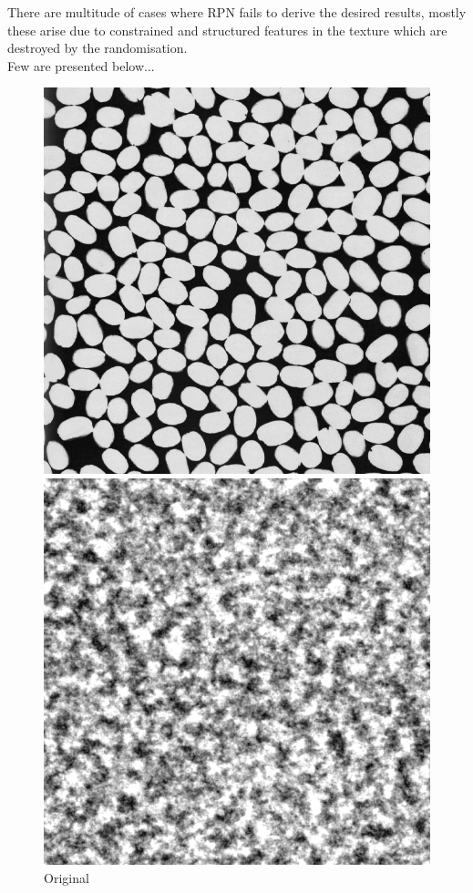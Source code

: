 \documentclass{article}
\begin{document}
\pagebreak
There are multitude of cases where RPN fails to derive the desired results, mostly these arise due to constrained and structured features in the texture which are destroyed by the randomisation.\\ Few are presented below...\\[10pt]

    \begin{figure}[!htb]
    \begin{center}
      \includegraphics[scale=.3]{5/report/random/3.png}
      \caption{Original}
    \end{center}
    \endminipage \hfill
    \begin{center}
      \includegraphics[scale=.3]{5/report/random/3_c.png}

\end{center}
\end{figure}
\end{document}
